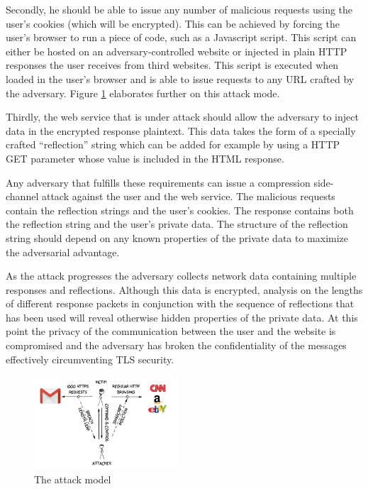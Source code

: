 Secondly, he should be able to issue any number of malicious requests using the
user's cookies (which will be encrypted). This can be achieved by forcing the
user's browser to run a piece of code, such as a Javascript script. This script
can either be hosted on an adversary-controlled website or injected in plain
HTTP responses the user receives from third websites. This script is executed
when loaded in the user's browser and is able to issue requests to any URL
crafted by the adversary. Figure \ref{fig:attack_model} elaborates further on
this attack mode.

Thirdly, the web service that is under attack should allow the adversary to
inject data in the encrypted response plaintext. This data takes the form of a
specially crafted ``reflection'' string which can be added for example by using
a HTTP GET parameter whose value is included in the HTML response.

Any adversary that fulfills these requirements can issue a compression
side-channel attack against the user and the web service. The malicious requests
contain the reflection strings and the user's cookies. The response contains
both the reflection string and the user's private data. The structure of the
reflection string should depend on any known properties of the private data to
maximize the adversarial advantage.

As the attack progresses the adversary collects network data containing multiple
responses and reflections. Although this data is encrypted, analysis on the
lengths of different response packets in conjunction with the sequence of
reflections that has been used will reveal otherwise hidden properties of the
private data.  At this point the privacy of the communication between the user
and the website is compromised and the adversary has broken the confidentiality
of the messages effectively circumventing TLS security.

    \begin{figure}[thpb]
        \centering
            \includegraphics[width=0.48\textwidth]{figures/attack_model.png}
        \caption{The attack model}
        \label{fig:attack_model}
    \end{figure}

